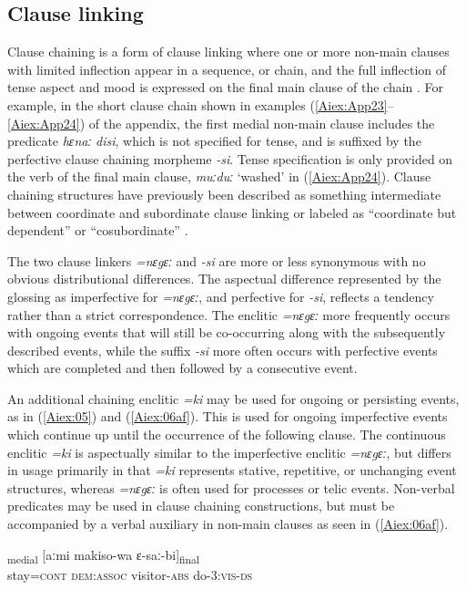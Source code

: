 \documentclass[output=paper]{LSP/langsci}
\begin{document}
\subsection{Clause linking} 
\label{Ailinking}
Clause chaining is a form of clause linking where one or more non-main clauses with limited
inflection appear in a sequence, or chain, and the full inflection of tense aspect and mood is expressed
on the final main clause of the chain \citep[][374--376]{longacre07}. For example, in the short clause chain shown
in examples (\ref{Aiex:App23}--\ref{Aiex:App24}) of the appendix, the first medial non-main clause includes the predicate \textit{hɛnaː} \textit{disi}, which is not specified for
tense, and is suffixed by the perfective clause chaining morpheme \textit{-si}. Tense specification is only provided on the verb of the final main clause, \textit{muːduː} `washed' in (\ref{Aiex:App24}). Clause chaining structures have previously been described as something intermediate
between coordinate and subordinate clause linking or labeled as ``coordinate but dependent''
\citep{haiman83}  or ``cosubordinate'' \citep{valin84}.

The two clause linkers \textit{=nɛgɛː} and \textit{-si} are more or less synonymous with no obvious
distributional differences. The aspectual difference represented by the glossing as imperfective for
\textit{=nɛgɛː}, and perfective for \textit{-si}, reflects a tendency rather than a strict correspondence. The enclitic \textit{=nɛgɛː}
more frequently occurs with ongoing events that will still be co-occurring along with the subsequently
described events, while the suffix \textit{-si} more often occurs with perfective events which are completed and
then followed by a consecutive event. 

An additional chaining enclitic \textit{=ki} may be used for ongoing or persisting events, as in (\ref{Aiex:05}) and (\ref{Aiex:06af}). This is used for ongoing imperfective events which continue up until the occurrence of the
following clause. The continuous enclitic \textit{=ki} is aspectually similar to the imperfective enclitic \textit{=nɛgɛː}, but differs in usage
primarily in that \textit{=ki} represents stative, repetitive, or unchanging event structures, whereas \textit{=nɛgɛː} is
often used for processes or telic events. Non-verbal predicates may be used in clause chaining
constructions, but must be accompanied by a verbal auxiliary in non-main clauses as seen in (\ref{Aiex:06af}).


\begin{exe}
\ex \label{Aiex:05}
\gll [sɛnɛ=\textbf{ki}]\textsubscript{medial} [aːmi makiso-wa ɛ-saː-bi]\textsubscript{final}\\
stay=\textsc{cont} \textsc{dem}:\textsc{assoc} visitor-\textsc{abs}	do-\textsc{3}:\textsc{vis}-\textsc{ds}\\
\glt {}\\
\end{exe}
\end{document}
